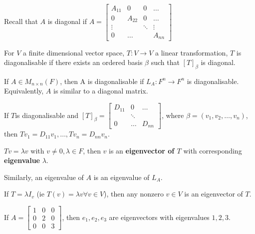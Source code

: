 \documentclass[11pt]{scrartcl}
\begin{document}
Recall that \(A\) is diagonal if \(A = \begin{bmatrix}
  A_{11} & 0 & 0 & \dots\\
  0 & A_{22} & 0 & \dots\\
  \vdots & &\ddots & \vdots\\
  0& \dots & &  A_{nn}
\end{bmatrix}\)

\begin{definition}
  For \(V\) a finite dimensional vector space, \(T: V\to V\) a linear
  transformation, \(T\) is diagonalisable if there exists an ordered
  basis \(\beta\) such that \([T]_{\beta}\) is diagonal.

  If \(A\in M_{n\times n}(F)\), then A is diagonalisable if
  \(L_{A}: F^{n} \to F^{n}\) is diagonalisable. Equivalently, \(A\) is
  similar to a diagonal matrix.
\end{definition}

If \(T\)is diagonalisable and \([T]_{\beta} = \begin{bmatrix}
  D_{11} & 0 & \dots \\
  & \ddots & \\
  0 & \dots & D_{nn}
\end{bmatrix}\), where \(\beta = (v_{1}, v_{2}, \dots, v_{n})\), then
\(Tv_{1} = D_{11}v_{1}, \dots,Tv_{n} =D_{nn}v_{n}\).

\begin{definition}
  \(Tv = \lambda v\) with \(v\neq 0, \lambda \in F\), then \(v\) is an
  \textbf{eigenvector of \(T\)} with corresponding \textbf{eigenvalue}
  \(\lambda\).

  Similarly, an eigenvalue of \(A\) is an eigenvalue of \(L_{A}\).
\end{definition}

\begin{example}
  If \(T=\lambda I_{v}\) (ie \(T(v) = \lambda v \forall v \in V\)),
  then any nonzero \(v\in V\) is an eigenvector of \(T\).
\end{example}
\begin{example}
  If \(A = \begin{bmatrix}
    1 & 0 & 0\\
    0 & 2 & 0\\
    0 & 0 & 3
  \end{bmatrix}\), then \(e_{1}, e_{2},e_{3}\) are eigenvectors with
eigenvalues \(1, 2, 3\).
\end{example}
\end{document}

